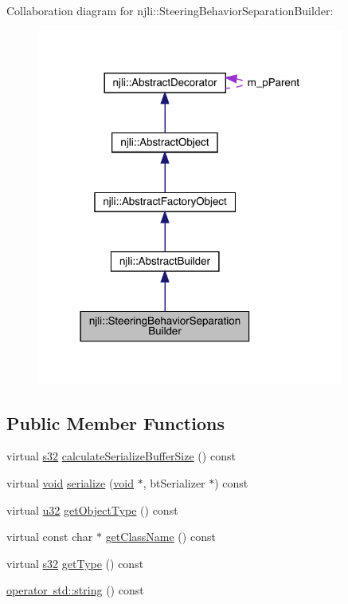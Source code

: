 Collaboration diagram for njli\+:\+:Steering\+Behavior\+Separation\+Builder\+:\nopagebreak
\begin{figure}[H]
\begin{center}
\leavevmode
\includegraphics[width=286pt]{classnjli_1_1_steering_behavior_separation_builder__coll__graph}
\end{center}
\end{figure}
\subsection*{Public Member Functions}
\begin{DoxyCompactItemize}
\item 
virtual \mbox{\hyperlink{_util_8h_aa62c75d314a0d1f37f79c4b73b2292e2}{s32}} \mbox{\hyperlink{classnjli_1_1_steering_behavior_separation_builder_a70235857b545f56d073ce1a60d034e88}{calculate\+Serialize\+Buffer\+Size}} () const
\item 
virtual \mbox{\hyperlink{_thread_8h_af1e856da2e658414cb2456cb6f7ebc66}{void}} \mbox{\hyperlink{classnjli_1_1_steering_behavior_separation_builder_a9c0a0f625cc3d56732df15284472ca89}{serialize}} (\mbox{\hyperlink{_thread_8h_af1e856da2e658414cb2456cb6f7ebc66}{void}} $\ast$, bt\+Serializer $\ast$) const
\item 
virtual \mbox{\hyperlink{_util_8h_a10e94b422ef0c20dcdec20d31a1f5049}{u32}} \mbox{\hyperlink{classnjli_1_1_steering_behavior_separation_builder_abe06bf7685fc4a11087eab052bdd6345}{get\+Object\+Type}} () const
\item 
virtual const char $\ast$ \mbox{\hyperlink{classnjli_1_1_steering_behavior_separation_builder_ad48a83519ff8f327eb065e1eb8394a6d}{get\+Class\+Name}} () const
\item 
virtual \mbox{\hyperlink{_util_8h_aa62c75d314a0d1f37f79c4b73b2292e2}{s32}} \mbox{\hyperlink{classnjli_1_1_steering_behavior_separation_builder_a8861f7768cbb12272e099439641885cc}{get\+Type}} () const
\item 
\mbox{\hyperlink{classnjli_1_1_steering_behavior_separation_builder_a478c5777dc02809c78aa44e0453be2d7}{operator std\+::string}} () const
\end{DoxyCompactItemize}
